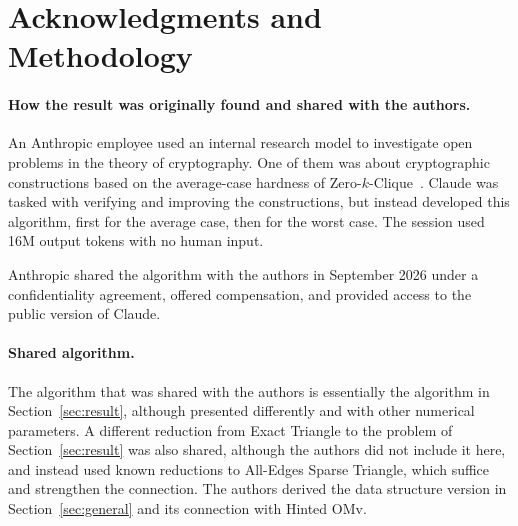 \documentclass[11pt]{article}
\theoremstyle{definition}
\theoremstyle{remark}
\begin{document}
\begin{abstract}
\vspace{12pt}

\textit{Claude, an AI model developed by Anthropic, discovered the algorithm that refutes the $3$SUM, APSP, and Exact Triangle hypotheses. The authors then worked to understand, simplify, strengthen, and extend the algorithm, derive additional consequences, and make the presentation accessible. See ``Acknowledgments and Methodology'' for how the result was found and shared with the authors. The authors take full responsibility for this paper.}

\vspace{12pt}

\textit{Claude also verified this paper's main results using the Lean 4 proof assistant with the Mathlib library.}
\end{abstract}

\newpage







\section*{Acknowledgments and Methodology}

\paragraph{How the result was originally found and shared with the authors.} An Anthropic employee used an internal research model to investigate open problems in the theory of cryptography. One of them was about cryptographic constructions based on the average-case hardness of Zero-$k$-Clique~\cite{LLV19,AHY25}. Claude was tasked with verifying and improving the constructions, but instead developed this algorithm, first for the average case, then for the worst case. The session used 16M output tokens with no human input.

Anthropic shared the algorithm with the authors in September 2026 under a confidentiality agreement, offered compensation, 
and provided access to the public version of Claude. 

\paragraph{Shared algorithm.}
The algorithm that was shared with the authors is essentially the algorithm in Section~\ref{sec:result}, although presented differently and with other numerical parameters. A different reduction from Exact Triangle to the problem of Section~\ref{sec:result} was also shared, although the authors did not include it here, and instead used known reductions to All-Edges Sparse Triangle, which suffice and strengthen the connection. The authors derived the data structure version in Section~\ref{sec:general} and its connection with Hinted OMv. 
\end{document}
